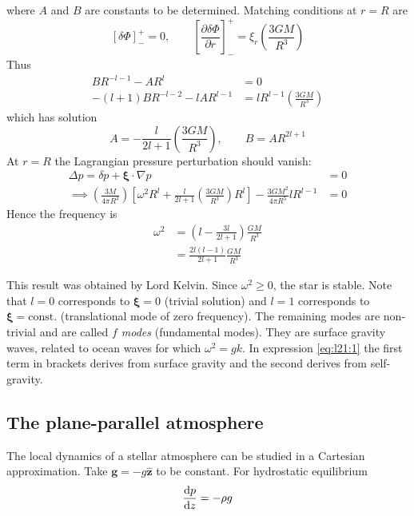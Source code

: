 \documentclass{jknotes}
\newcommand{\disp}{\symbf{\xi}}
\begin{document}
where $A$ and $B$ are constants to be determined. Matching conditions at $r=R$
are
\begin{equation}
	\left[\delta \Phi\right]^+_- = 0, \hspace{2em} \left[ \frac{\partial
	\delta \Phi}{\partial r} \right]^+_- = \xi_r \left(\frac{3GM}{R^3}\right)
\end{equation}
Thus
\begin{align}
	BR^{-l-1} - AR^l &= 0 \\
	-(l+1)BR^{-l-2} -lAR^{l-1} &= lR^{l-1}\left(\frac{3GM}{R^3}\right) 
\end{align}
which has solution
\begin{equation}
	A = -\frac{l}{2l+1}\left(\frac{3GM}{R^3}\right), \hspace{2em} B =
	AR^{2l+1}
\end{equation}
At $r=R$ the Lagrangian pressure perturbation should vanish:
\begin{align}
	\Delta p = \delta p + \disp \cdot \nabla p &= 0 \\
	\implies\left(\frac{3M}{4\pi R^3}\right)\left[ \omega^2 R^l +
	\frac{l}{2l+1}\left(\frac{3GM}{R^3}\right)R^l\right] -
	\frac{3GM^2}{4\pi R^5}lR^{l-1} &= 0
\end{align}
Hence the frequency is
\begin{align}
	\omega^2 &= \left( l - \frac{3l}{2l+1}\right)\frac{GM}{R^3} \label{eq:l21:1}\\
					  &= \frac{2l(l-1)}{2l+1}\frac{GM}{R^3}
\end{align}

This result was obtained by Lord Kelvin. Since $\omega^2 \ge 0$, the star is
stable. Note that $l=0$ corresponds to $\disp = 0$ (trivial solution) and
$l=1$ corresponds to $\disp = \text{const.}$ (translational mode of zero
frequency). The remaining modes are non-trivial and are called \emph{$f$
modes} (fundamental modes). They are surface gravity waves, related to ocean
waves for which $\omega^2 = gk$. In expression \eqref{eq:l21:1} the first term
in brackets derives from surface gravity and the second derives from
self-gravity.

\subsection{The plane-parallel atmosphere}
The local dynamics of a stellar atmosphere can be studied in a Cartesian
approximation. Take $\symbf{g} = -g\hat{\symbf{z}}$ to be constant. For
hydrostatic equilibrium
\begin{equation}
	\frac{\diffd p}{\diffd z} = -\rho g
\end{equation}
\end{document}
